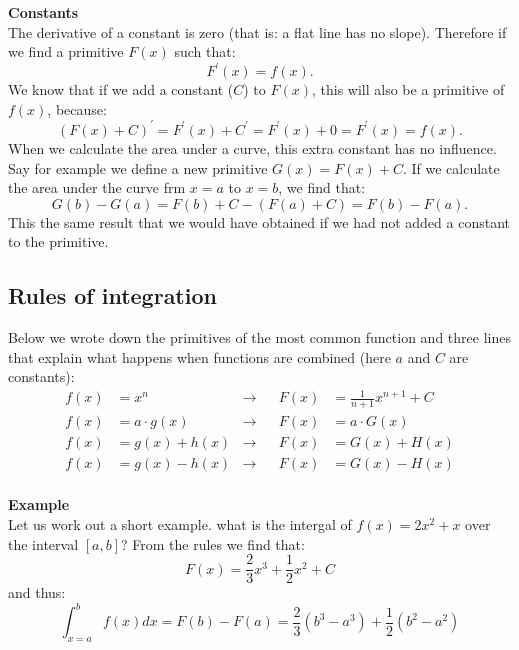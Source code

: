\documentclass[a4paper]{report}
\begin{document}
\begin{mdframed}
\textbf{Constants}\\
The derivative of a constant is zero (that is: a flat line has no slope). Therefore if we find a primitive $F(x)$ such that:
\begin{equation*}
F^\prime(x) = f(x). 
\end{equation*}
We know that if we add a constant ($C$) to $F(x)$, this will also be a primitive of $f(x)$, because:
\begin{equation*}
(F(x)+C)^\prime = F^\prime(x) + C^\prime = F^\prime(x) + 0 = F^\prime(x) = f(x).
\end{equation*}
When we calculate the area under a curve, this extra constant has no influence. Say for example we define a new primitive $G(x) = F(x) + C$. If we calculate the area under the curve frm $x=a$ to $x=b$, we find that:
\begin{equation*}
G(b) - G(a) = F(b) + C - (F(a) + C) = F(b) - F(a).
\end{equation*}
This the same result that we would have obtained if we had not added a constant to the primitive.
\end{mdframed}

\subsection{Rules of integration}
Below we wrote down the primitives of the most common function and three lines that explain what happens when functions are combined (here $a$ and $C$ are constants):
\begin{align*}
f(x) &= x^n  &\rightarrow & &F(x) &= \frac{1}{n+1}x^{n+1}+C \\
f(x) &= a\cdot g(x) &\rightarrow & &F(x) &= a\cdot G(x) \\
f(x) &= g(x) + h(x) &\rightarrow & &F(x) &= G(x) + H(x)\\
f(x) &= g(x) - h(x) &\rightarrow & &F(x) &= G(x) - H(x)\\
\end{align*}

\begin{mdframed}[backgroundcolor=exampcol]
\textbf{Example}\\
Let us work out a short example. what is the intergal of $f(x)=2 x^2 + x$ over the interval $\left[a,b\right]$? From the rules we find that:
\begin{equation*}
F(x) = \frac{2}{3} x^3 + \frac{1}{2} x^2+ C
\end{equation*}
and thus:
\begin{equation*}
\int_{x=a}^b f(x) dx = F(b)-F(a) = \frac{2}{3} \left(b^3 - a^3\right) + \frac{1}{2}\left(b^2-a^2\right)
\end{equation*}
\end{mdframed}
\end{document}
